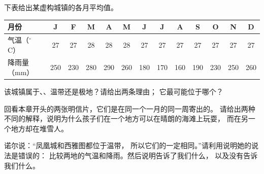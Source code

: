 \begin{exercise}[$\star\star$]\label{exo:g5:weather-and-climate:9}
下表给出某虚构城镇的各月平均值。
\begin{center}
\begin{tabular}{|l|*{12}{c|}}
\hline
月份 & J & F & M & A & M & J & J & A & S & O & N & D\\
\hline
气温（$^\circ$C） & 27 & 27 & 28 & 28 & 28 & 27 & 27 & 27 & 27 & 27 & 27 & 27\\
\hline
降雨量（mm） & 250 & 230 & 280 & 290 & 260 & 180 & 170 & 160 & 190 & 230 & 250 & 260\\
\hline
\end{tabular}
\end{center}
该城镇属于、、温带还是极地？请给出两条理由；
它最可能位于哪个？
\end{exercise}

\begin{exercise}[$\star\star$]\label{exo:g5:weather-and-climate:10}
回看本章开头的两张明信片，它们是在同一个一月的同一周寄出的。
请给出两种不同的解释，说明为什么孩子们在一个地方可以在晴朗的海滩上玩耍，
而在另一个地方却在堆雪人。
\end{exercise}

\begin{exercise}[$\star\star\star$]\label{exo:g5:weather-and-climate:11}
诺尔说：“凤凰城和西雅图都位于温带，
所以它们的一定相同。”请利用说明她的说法是错误的：
比较两地的气温和降雨。然后说明告诉了我们什么，
以及没有告诉我们什么。
\end{exercise}
